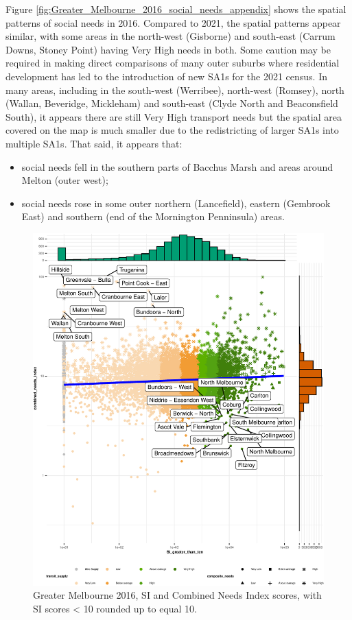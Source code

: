 \documentclass[preprint, 3p,
authoryear]{elsarticle} %
\providecommand{\tightlist}{%
  \setlength{\itemsep}{0pt}\setlength{\parskip}{0pt}}
\begin{document}
Figure \ref{fig:Greater_Melbourne_2016_social_needs_appendix} shows the
spatial patterns of social needs in 2016. Compared to 2021, the spatial
patterns appear similar, with some areas in the north-west (Gisborne)
and south-east (Carrum Downs, Stoney Point) having Very High needs in
both. Some caution may be required in making direct comparisons of many
outer suburbs where residential development has led to the introduction
of new SA1s for the 2021 census. In many areas, including in the
south-west (Werribee), north-west (Romsey), north (Wallan, Beveridge,
Mickleham) and south-east (Clyde North and Beaconsfield South), it
appears there are still Very High transport needs but the spatial area
covered on the map is much smaller due to the redistricting of larger
SA1s into multiple SA1s. That said, it appears that:

\begin{itemize}
\tightlist
\item
  social needs fell in the southern parts of Bacchus Marsh and areas
  around Melton (outer west);
\item
  social needs rose in some outer northern (Lancefield), eastern
  (Gembrook East) and southern (end of the Mornington Penninsula) areas.
\end{itemize}

\begin{figure}
\centering
\includegraphics{ReynoldsCurrieQu2024_files/figure-latex/Greater_Melbourne_2016_needs_gap_scatterplot_figure-1.pdf}
\caption{Greater Melbourne 2016, SI and Combined Needs Index scores,
with SI scores \textless{} 10 rounded up to equal 10.}
\end{figure}
\end{document}
